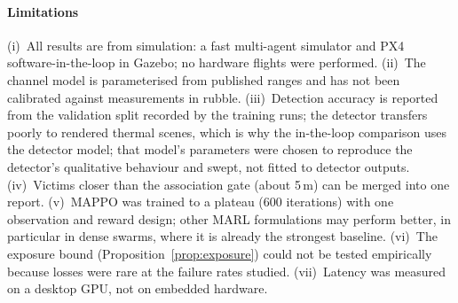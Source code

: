 \paragraph{Limitations}
(i)~All results are from simulation: a fast multi-agent simulator and PX4 software-in-the-loop in
Gazebo; no hardware flights were performed. (ii)~The channel model is parameterised from published
ranges and has not been calibrated against measurements in rubble. (iii)~Detection accuracy is
reported from the validation split recorded by the training runs; the detector transfers poorly to
rendered thermal scenes, which is why the in-the-loop comparison uses the detector model; that
model's parameters were chosen to reproduce the detector's qualitative behaviour and swept, not
fitted to detector outputs.
(iv)~Victims closer than the association gate (about 5\,m) can be merged into one report.
(v)~MAPPO was trained to a plateau (600 iterations) with one observation and reward design; other
MARL formulations may perform better, in particular in dense swarms, where it is already the strongest
baseline. (vi)~The exposure bound
(Proposition~\ref{prop:exposure}) could not be tested empirically because losses were rare at the
failure rates studied. (vii)~Latency was measured on a desktop GPU, not on embedded hardware.
